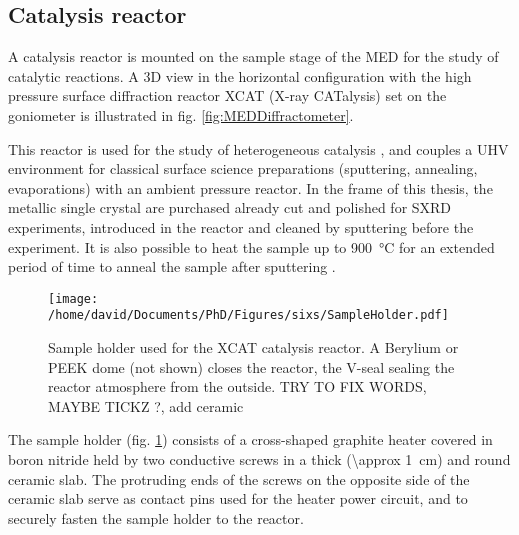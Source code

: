 \subsection{Catalysis reactor}\label{sec:XCAT}

A catalysis reactor is mounted on the sample stage of the MED for the study of catalytic reactions.
A 3D view in the horizontal configuration with the high pressure surface diffraction reactor XCAT (X-ray CATalysis) set on the goniometer is illustrated in fig. \ref{fig:MEDDiffractometer}.

This reactor is used for the study of heterogeneous catalysis \parencite{VanRijn2010, Resta2020a}, and couples a UHV environment for classical surface science preparations (sputtering, annealing, evaporations) with an ambient pressure reactor.
In the frame of this thesis, the metallic single crystal are purchased already cut and polished for SXRD experiments, introduced in the reactor and cleaned by sputtering \parencite{Taglauer1990} before the experiment.
It is also possible to heat the sample up to \qty{900}{\degreeCelsius} for an extended period of time to anneal the sample after sputtering \parencite{MUSKET1982143}.

\begin{figure}[!htb]
    \centering
    \texttt{[image: /home/david/Documents/PhD/Figures/sixs/SampleHolder.pdf]}
    \caption{
        Sample holder used for the XCAT catalysis reactor.
        A Berylium or PEEK dome (not shown) closes the reactor, the V-seal sealing the reactor atmosphere from the outside.
        \textcolor{Important}{TRY TO FIX WORDS, MAYBE TICKZ ?, add ceramic}
    }
    \label{fig:SampleHolder}
\end{figure}

The sample holder (fig. \ref{fig:SampleHolder}) consists of a cross-shaped graphite heater covered in boron nitride held by two conductive screws in a thick (\qty{\approx 1}{\cm}) and round ceramic slab.
The protruding ends of the screws on the opposite side of the ceramic slab serve as contact pins used for the heater power circuit, and to securely fasten the sample holder to the reactor.


